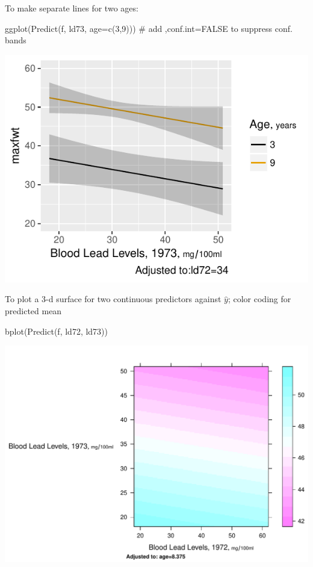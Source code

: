\item To make separate lines for two ages: \ipacue
\begin{Schunk}
\begin{Sinput}
ggplot(Predict(f, ld73, age=c(3,9)))  # add ,conf.int=FALSE to suppress conf. bands
\end{Sinput}


\centerline{\includegraphics{rmsintro-unnamed-chunk-15-1} }

\end{Schunk}
\item To plot a 3-d surface for two continuous predictors against
  $\hat{y}$; color coding for predicted mean  \ipacue
\begin{Schunk}
\begin{Sinput}
bplot(Predict(f, ld72, ld73))
\end{Sinput}


\centerline{\includegraphics{rmsintro-unnamed-chunk-16-1} }

\end{Schunk}
\ei

